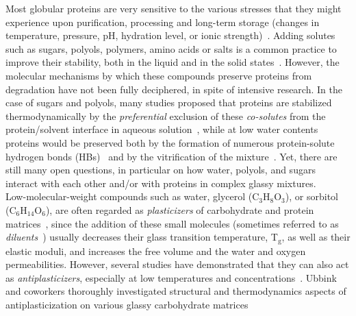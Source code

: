 \documentclass[journal=jpcbfk,manuscript=article]{achemso}
\begin{document}
\begin{singlespacing}
Most globular proteins are very sensitive to the various stresses that they might 
experience upon purification, processing and long-term storage (changes in temperature, pressure, pH, hydration level, or
ionic strength)~\cite{Wang1999,Wang2000,Arakawa2001,Manning2010,Ohtake2011}.
Adding solutes such as sugars, polyols, polymers, amino acids or salts is a common practice to improve their stability, 
both in the liquid and in the solid states~\cite{Wang1999,Wang2000,Manning2010,Ohtake2011,Soltanizadeh2014,Cicerone2015}. 
However, the molecular mechanisms by which these compounds preserve proteins from degradation have not been fully deciphered, 
in spite of intensive research. In the case of sugars and polyols, many studies proposed that 
proteins are stabilized thermodynamically by the \textit{preferential} exclusion of these \textit{co-solutes} 
from the protein/solvent interface in aqueous solution~\cite{Gekko1981,Timasheff2002}, while at low water contents 
proteins would be preserved both by the formation of numerous protein-solute hydrogen bonds (HBs)~\cite{Carpenter1989,Crowe1998,Allison1999,Sakurai2008} 
and by the vitrification of the mixture~\cite{Green1989}. Yet, there are still many open questions, 
in particular on how water, polyols, and sugars interact with each other and/or with proteins in complex glassy mixtures.\\
Low-molecular-weight compounds such as water, glycerol (C$_{\textrm{3}}$H$_{\textrm{8}}$O$_{\textrm{3}}$), or 
sorbitol (C$_{\textrm{6}}$H$_{\textrm{14}}$O$_{\textrm{6}}$), are often regarded as \textit{plasticizers} of 
carbohydrate and protein 
matrices~\cite{Roos1991b,Hancock1994,Lourdin1998,Paciaroni2002,Verbeek2010,Townrow2010,Roussenova2010,Bellavia2011,Roussenova2014,Roussenova2014b,Weng2015,Ubbink2016}, 
since the addition of these small molecules (sometimes referred to as \textit{diluents}~\cite{Lourdin1998,Seow1999,Cicerone2004,Townrow2010,Roussenova2010,Cicerone2012,Roussenova2014,Roussenova2014b,Ubbink2016}) usually decreases their glass transition temperature, T$_{\textrm{g}}$, as well as 
their elastic moduli, and increases the free volume and the water and oxygen permeabilities. 
However, several studies have demonstrated that they can also act as \textit{antiplasticizers}, especially at low temperatures and 
concentrations~\cite{Lourdin1997,Seow1999,Cicerone2004,Chang2005_2,Townrow2010,Roussenova2010,Cicerone2012,Roussenova2014,Roussenova2014b,Ubbink2016}.
Ubbink and coworkers thoroughly investigated structural and thermodynamics aspects of antiplasticization on various glassy carbohydrate matrices

\end{singlespacing}
\end{document}

